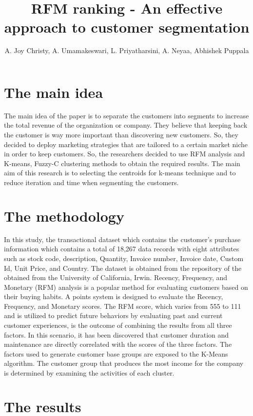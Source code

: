 \documentclass[a4paper]{article}
\title{RFM ranking - An effective approach to customer segmentation}
\author[1]{A. Joy Christy, A. Umamakeswari, L. Priyatharsini, A. Neyaa, Abhishek Puppala}
\begin{document}
\maketitle
\section{The main idea}

The main idea of the paper is to separate the customers into segments to increase the total revenue of the organization or company. They believe that keeping back the customer is way more important than discovering new customers. So, they decided to deploy marketing strategies that are tailored to a certain market niche in order to keep customers. So, the researchers decided to use RFM analysis and K-means, Fuzzy-C clustering methods to obtain the required results. The main aim of this research is to selecting the centroids for k-means technique and to reduce iteration and time when segmenting the customers. 

\section{The methodology }

In this study, the transactional dataset which contains the customer’s purchase information which contains a total of 18,267 data records with eight attributes such as stock code, description, Quantity, Invoice number, Invoice date, Custom Id, Unit Price, and Country. The dataset is obtained from the repository of the obtained from the University of California, Irwin. Recency, Frequency, and Monetary (RFM) analysis is a popular method for evaluating customers based on their buying habits. A points system is designed to evaluate the Recency, Frequency, and Monetary scores. The RFM score, which varies from 555 to 111 and is utilized to predict future behaviors by evaluating past and current customer experiences, is the outcome of combining the results from all three factors. In this scenario, it has been discovered that customer duration and maintenance are directly correlated with the scores of the three factors. The factors used to generate customer base groups are exposed to the K-Means algorithm. The customer group that produces the most income for the company is determined by examining the activities of each cluster.

\section{The results}
 
\end{document}
